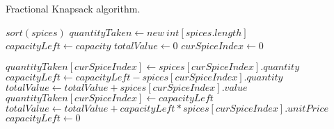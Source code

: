 \documentclass[letterpaper, 10pt,DIV=13]{scrartcl}
\numberwithin{equation}{section} %
\numberwithin{figure}{section} %
\numberwithin{table}{section} %
\begin{document}
\begin{algorithm}
  \caption{Fractional Knapsack algorithm.}
  \label{algorithm:fracKnapsack}
  \begin{algorithmic}[1]
      \State $sort(spices)$ 
      \State $quantityTaken \gets new~int[spices.length]$ 
      \State $capacityLeft \gets capacity$ 
      \State $totalValue \gets 0$ 
      \State $curSpiceIndex \gets 0$ 

         
          \State $quantityTaken[curSpiceIndex] \gets spices[curSpiceIndex].quantity$
          \State $capacityLeft \gets capacityLeft - spices[curSpiceIndex].quantity$
          \State $totalValue \gets totalValue + spices[curSpiceIndex].value$ 
        \Else {}
          \State $quantityTaken[curSpiceIndex] \gets capacityLeft$
          \State $totalValue \gets totalValue + capacityLeft * spices[curSpiceIndex].unitPrice$
          \State $capacityLeft \gets 0$
        \EndIf

         
      \EndWhile
      \State {}
    \EndProcedure
  \end{algorithmic}
\end{algorithm}
\end{document}
